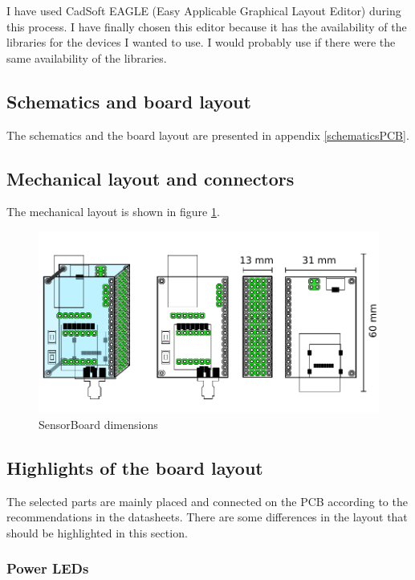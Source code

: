 I have used CadSoft EAGLE (Easy Applicable Graphical Layout Editor) \cite{EAGLE} during this process. I have finally chosen this editor because it has the availability of the libraries for the devices I wanted to use. I would probably use  \cite{KiCad} if there were the same availability of the libraries.

\subsection{Schematics and board layout}
The schematics and the board layout are presented in appendix \ref{schematicsPCB}.

\subsection{Mechanical layout and connectors}
The mechanical layout is shown in figure \ref{fig:HWdimensions}.

\begin{figure}
    \centering
    \caption{SensorBoard dimensions}
    \label{fig:HWdimensions}
    \includegraphics[scale=1]{img/HWdimensions.pdf}
\end{figure}

\subsection{Highlights of the board layout}
The selected parts are mainly placed and connected on the \ac{PCB} according to the recommendations in the datasheets. There are some differences in the  layout that should be highlighted in this section.

\subsubsection{Power LEDs}

